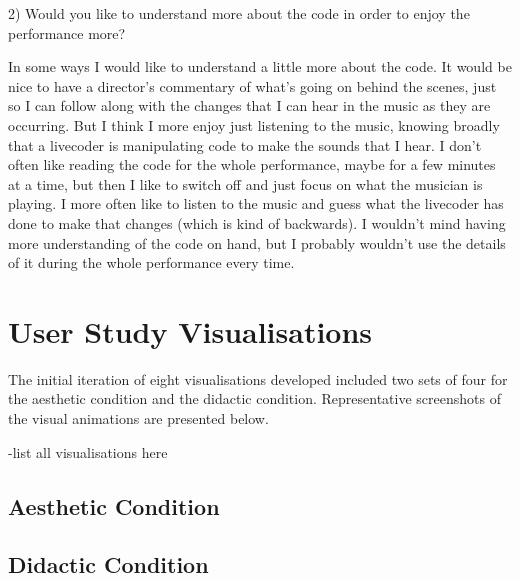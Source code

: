 2) Would you like to understand more about the code in order to enjoy the performance more?

In some ways I would like to understand a little more about the code. It would be nice to have a director's commentary of what's going on behind the scenes, just so I can follow along with the changes that I can hear in the music as they are occurring. But I think I more enjoy just listening to the music, knowing broadly that a livecoder is manipulating code to make the sounds that I hear. I don't often like reading the code for the whole performance, maybe for a few minutes at a time, but then I like to switch off and just focus on what the musician is playing. I more often like to listen to the music and guess what the livecoder has done to make that changes (which is kind of backwards). I wouldn't mind having more understanding of the code on hand, but I probably wouldn't use the details of it during the whole performance every time.


\chapter{User Study Visualisations}

The initial iteration of eight visualisations developed included two sets of four for the aesthetic condition and the didactic condition. Representative screenshots of the visual animations are presented below.

-list all visualisations here

\section*{Aesthetic Condition}

\section*{Didactic Condition}






